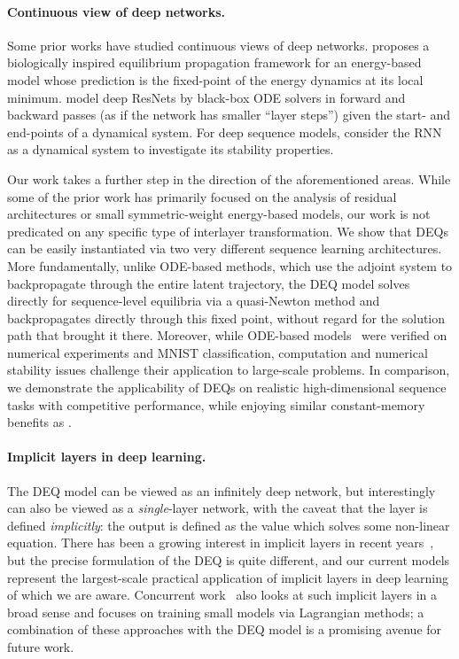 \documentclass{article}
\begin{document}
\vspace{-2mm}
\paragraph{Continuous view of deep networks.} Some prior works have studied continuous views of deep networks. \cite{scellier2017equilibrium} proposes a biologically inspired equilibrium propagation framework for an energy-based model whose prediction is the fixed-point of the energy dynamics at its local minimum. \cite{haber2017stable,chen2018neural} model deep ResNets by black-box ODE solvers in forward and backward passes (as if the network has smaller ``layer steps'') given the start- and end-points of a dynamical system. For deep sequence models, \cite{simard1989fixed,miller2018recurrent} consider the RNN as a dynamical system to investigate its stability properties.

Our work takes a further step in the direction of the aforementioned areas. While some of the prior work has primarily focused on the analysis of residual architectures or small symmetric-weight energy-based models, our work is not predicated on any specific type of interlayer transformation. We show that DEQs can be easily instantiated via two very different sequence learning architectures. More fundamentally, unlike ODE-based methods, which use the adjoint system to backpropagate through the entire latent trajectory, the DEQ model solves directly for sequence-level equilibria via a quasi-Newton method and backpropagates directly through this fixed point, without regard for the solution path that brought it there. Moreover, while ODE-based models~\citep{haber2017stable,chen2018neural} were verified on numerical experiments and MNIST classification, computation and numerical stability issues challenge their application to large-scale problems. In comparison, we demonstrate the applicability of DEQs on realistic high-dimensional sequence tasks with competitive performance, while enjoying similar constant-memory benefits as \cite{chen2018neural}.

\vspace{-2mm}
\paragraph{Implicit layers in deep learning.} The DEQ model can be viewed as an infinitely deep network, but interestingly can also be viewed as a \emph{single}-layer network, with the caveat that the layer is defined \emph{implicitly}: the output  is defined as the value which solves some non-linear equation.  There has been a growing interest in implicit layers in recent years~\citep{niculae2018sparsemap,amos2017optnet,niculae2018sparsemap,wang2019satnet}, but the precise formulation of the DEQ is quite different, and our current models represent the largest-scale practical application of implicit layers in deep learning of which we are aware. Concurrent work~\cite{elghaoui2019implicit} also looks at such implicit layers in a broad sense and focuses on training small models via Lagrangian methods; a combination of these approaches with the DEQ model is a promising avenue for future work.
\end{document}
